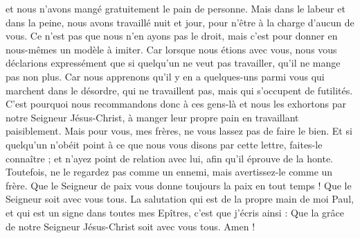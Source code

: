 \begin{multicols}{2}
et nous n'avons mangé gratuitement le pain de personne. Mais dans le labeur et dans la peine, nous avons travaillé nuit et jour, pour n'être à la charge d'aucun de vous.
Ce n'est pas que nous n'en ayons pas le droit, mais c'est pour donner en nous-mêmes un modèle à imiter.
Car lorsque nous étions avec vous, nous vous déclarions expressément que si quelqu'un ne veut pas travailler, qu'il ne mange pas non plus.
Car nous apprenons qu'il y en a quelques-uns parmi vous qui marchent dans le désordre, qui ne travaillent pas, mais qui s'occupent de futilités.
C'est pourquoi nous recommandons donc à ces gens-là et nous les exhortons par notre Seigneur Jésus-Christ, à manger leur propre pain en travaillant paisiblement.
Mais pour vous, mes frères, ne vous lassez pas de faire le bien.
Et si quelqu'un n'obéit point à ce que nous vous disons par cette lettre, faites-le connaître ; et n'ayez point de relation avec lui, afin qu'il éprouve de la honte.
Toutefois, ne le regardez pas comme un ennemi, mais avertissez-le comme un frère.
Que le Seigneur de paix vous donne toujours la paix en tout temps ! Que le Seigneur soit avec vous tous.
La salutation qui est de la propre main de moi Paul, et qui est un signe dans toutes mes Epîtres, c'est que j'écris ainsi :
Que la grâce de notre Seigneur Jésus-Christ soit avec vous tous. Amen !
\PPE{}
\end{multicols}
